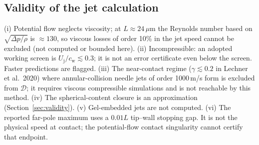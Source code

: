 \subsection{Validity of the jet calculation}
(i) Potential flow neglects viscosity; at $L\approx24\,\mu$m the Reynolds number based on
$\sqrt{\Delta p/\rho}$ is $\approx130$, so viscous losses of order 10\% in the jet speed cannot be excluded
(not computed or bounded here). (ii) Incompressible: an adopted working screen is
$U_{\mathrm j}/c_{\mathrm w}\lesssim0.3$; it is not an error certificate even below the screen. Faster
predictions are flagged. (iii) The near-contact regime ($\gamma\lesssim0.2$ in Lechner et al.\ 2020) where
annular-collision needle jets of order 1000\,m/s form is excluded from $\mathcal D$; it requires
viscous compressible simulations and is not reachable by this method. (iv) The spherical-content closure
is an approximation (Section~\ref{sec:validity}). (v) Gel-embedded jets are not computed.
(vi) The reported far-pole maximum uses a $0.01L$ tip--wall stopping gap. It is not the physical
speed at contact; the potential-flow contact singularity cannot certify that endpoint.
